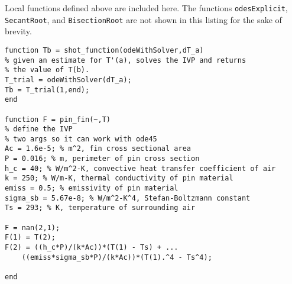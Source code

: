 Local functions defined above are included here.  The functions \lstinline[style=myMatlab]{odesExplicit}, \lstinline[style=myMatlab]{SecantRoot}, and \lstinline[style=myMatlab]{BisectionRoot} are not shown in this listing for the sake of brevity.
\begin{lstlisting}[style=myMatlab,name=lec28n-ex1]
%% Local Functions
function Tb = shot_function(odeWithSolver,dT_a)
% given an estimate for T'(a), solves the IVP and returns
% the value of T(b).
T_trial = odeWithSolver(dT_a);
Tb = T_trial(1,end);
end

function F = pin_fin(~,T)
% define the IVP
% two args so it can work with ode45
Ac = 1.6e-5; % m^2, fin cross sectional area
P = 0.016; % m, perimeter of pin cross section
h_c = 40; % W/m^2-K, convective heat transfer coefficient of air
k = 250; % W/m-K, thermal conductivity of pin material
emiss = 0.5; % emissivity of pin material
sigma_sb = 5.67e-8; % W/m^2-K^4, Stefan-Boltzmann constant
Ts = 293; % K, temperature of surrounding air

F = nan(2,1);
F(1) = T(2);
F(2) = ((h_c*P)/(k*Ac))*(T(1) - Ts) + ...
    ((emiss*sigma_sb*P)/(k*Ac))*(T(1).^4 - Ts^4);

end

\end{lstlisting}

